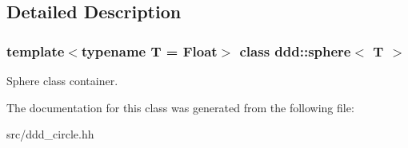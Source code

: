 \subsection{Detailed Description}
\subsubsection*{template$<$typename T = Float$>$\newline
class ddd\+::sphere$<$ T $>$}

Sphere class container. 

The documentation for this class was generated from the following file\+:\begin{DoxyCompactItemize}
\item 
src/ddd\+\_\+circle.\+hh\end{DoxyCompactItemize}
